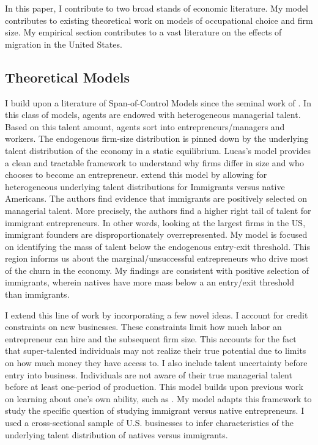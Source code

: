 
In this paper, I contribute to two broad stands of economic literature. My model contributes to existing theoretical work on models of occupational choice and firm size. My empirical section contributes to a vast literature on the effects of migration in the United States.

\subsection{Theoretical Models}

    I build upon a literature of Span-of-Control Models since the seminal work of \cite{LucasModel}. In this class of models, agents are endowed with heterogeneous managerial talent. Based on this talent amount, agents sort into entrepreneurs/managers and workers. The endogenous firm-size distribution is pinned down by the underlying talent distribution of the economy in a static equilibrium. Lucas's model provides a clean and tractable framework to understand why firms differ in size and who chooses to become an entrepreneur. \cite{Azoulay} extend this model by allowing for heterogeneous underlying talent distributions for Immigrants versus native Americans. The authors find evidence that immigrants are positively selected on managerial talent. More precisely, the authors find a higher right tail of talent for immigrant entrepreneurs. In other words, looking at the largest firms in the US, immigrant founders are disproportionately overrepresented. My model is focused on identifying the mass of talent below the endogenous entry-exit threshold. This region informs us about the marginal/unsuccessful entrepreneurs who drive most of the churn in the economy. My findings are consistent with positive selection of immigrants, wherein natives have more mass below a an entry/exit threshold than immigrants.
    
    I extend this line of work by incorporating a few novel ideas. I account for credit constraints on new businesses. These constraints limit how much labor an entrepreneur can hire and the subsequent firm size. This accounts for the fact that super-talented individuals may not realize their true potential due to limits on how much money they have access to. I also include talent uncertainty before entry into business. Individuals are not aware of their true managerial talent before at least one-period of production. This model builds upon previous work on learning about one's own ability, such as \cite{Jovanovic}. My model adapts this framework to study the specific question of studying immigrant versus native entrepreneurs. I used a cross-sectional sample of U.S. businesses to infer characteristics of the underlying talent distribution of natives versus immigrants.
    
